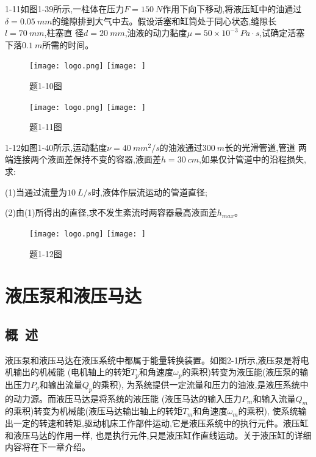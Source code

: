1-11\quad 如图1-39所示,一柱体在压力$F=150\ N$作用下向下移动,将液压缸中的油通过
$\delta =0.05\ mm$的缝隙排到大气中去。假设活塞和缸筒处于同心状态,缝隙长$l=70\ mm$,柱塞直
径$d=20\ mm$,油液的动力黏度$\mu =50\times 10^{-3}\ Pa\cdot s$,试确定活塞下落$0.1\ m$所需的时间。

\begin{figure}[h]
    \centering
    \ifOpenSource
    \texttt{[image: logo.png]}
    \else
    \texttt{[image: ]}
    \fi
    \caption{题1-10图}
    \label{fig:fig0138}
\end{figure}

\begin{figure}[h]
    \centering
    \ifOpenSource
    \texttt{[image: logo.png]}
    \else
    \texttt{[image: ]}
    \fi
    \caption{题1-11图}
    \label{fig:fig0139}
\end{figure}

1-12\quad 如图1-40所示,运动黏度$\nu = 40\ mm^2/s$的油液通过$300\ m$长的光滑管道,管道
两端连接两个液面差保持不变的容器,液面差$h=30\ cm$,如果仅计管道中的沿程损失,求:

(1)当通过流量为$10\ L/s$时,液体作层流运动的管道直径;
    
(2)由(1)所得出的直径,求不发生紊流时两容器最高液面差$h_{max}$。

\begin{figure}[h]
    \centering
    \ifOpenSource
    \texttt{[image: logo.png]}
    \else
    \texttt{[image: ]}
    \fi
    \caption{题1-12图}
    \label{fig:fig0140}
\end{figure}

\chapter{液压泵和液压马达}
\section{概\ 述}
液压泵和液压马达在液压系统中都属于能量转换装置。如图2-1所示,液压泵是将电机输出的机械能
(电机轴上的转矩$T_p$和角速度$\omega_p$的乘积)转变为液压能(液压泵的输出压力$P_p$和输出流量$Q_p$的乘积),
为系统提供一定流量和压力的油液,是液压系统中的动力源。而液压马达是将系统的液压能
(液压马达的输入压力$P_m$和输入流量$Q_m$的乘积)转变为机械能(液压马达输出轴上的转矩$T_m$和角速度$\omega_m$的乘积),
使系统输出一定的转速和转矩,驱动机床工作部件运动,它是液压系统中的执行元件。液压缸和液压马达的作用一样,
也是执行元件,只是液压缸作直线运动。关于液压缸的详细内容将在下一章介绍。

